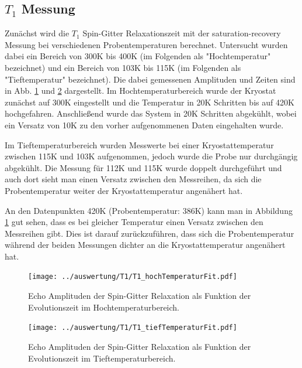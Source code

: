 \subsection{$T_1$ Messung}
Zunächst wird die $T_1$ Spin-Gitter Relaxationszeit mit der saturation-recovery Messung bei verschiedenen Probentemperaturen berechnet. Untersucht wurden dabei ein Bereich von 300K bis 400K (im Folgenden als "Hochtemperatur" bezeichnet) und ein Bereich von 103K bis 115K (im Folgenden als "Tieftemperatur" bezeichnet). Die dabei gemessenen Amplituden und Zeiten sind in Abb. \ref{pic_T1_hoch} und \ref{pic_T1_tief} dargestellt. Im Hochtemperaturbereich wurde der Kryostat zunächst auf 300K eingestellt und die Temperatur in 20K Schritten bis auf 420K hochgefahren. Anschließend wurde das System in 20K Schritten abgekühlt, wobei ein Versatz von 10K zu den vorher aufgenommenen Daten eingehalten wurde.

Im Tieftemperaturbereich wurden Messwerte bei einer Kryostattemperatur zwischen 115K und 103K aufgenommen, jedoch wurde die Probe nur durchgängig abgekühlt.
Die Messung für 112K und 115K wurde doppelt durchgeführt und auch dort sieht man einen Versatz zwischen den Messreihen, da sich die Probentemperatur weiter der Kryostattemperatur angenähert hat.

An den Datenpunkten 420K (Probentemperatur: 386K) kann man in Abbildung \ref{pic_T1_hoch} gut sehen, dass es bei gleicher Temperatur einen Versatz zwischen den Messreihen gibt. Dies ist darauf zurückzuführen, dass sich die Probentemperatur während der beiden Messungen dichter an die Kryostattemperatur angenähert hat.
\begin{figure}[htbp]
	\texttt{[image: ../auswertung/T1/T1\_hochTemperaturFit.pdf]}
	\caption{Echo Amplituden der Spin-Gitter Relaxation als Funktion der Evolutionszeit im Hochtemperaturbereich.}
	\label{pic_T1_hoch}
\end{figure}
\begin{figure}[htbp]
	\texttt{[image: ../auswertung/T1/T1\_tiefTemperaturFit.pdf]}
	\caption{Echo Amplituden der Spin-Gitter Relaxation als Funktion der Evolutionszeit im Tieftemperaturbereich.}
	\label{pic_T1_tief}
\end{figure}

